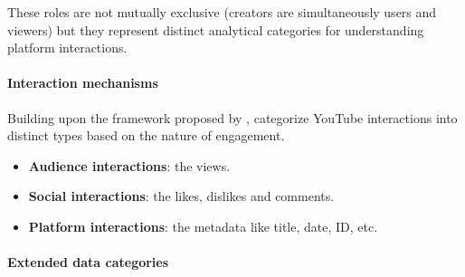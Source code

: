 These roles are not mutually exclusive (creators are simultaneously users and viewers) but they represent distinct analytical categories for understanding platform interactions.

\paragraph{Interaction mechanisms}

Building upon the framework proposed by \textcite{giglietto2012open}, \textcite{sui2022youtube} categorize YouTube interactions into distinct types based on the nature of engagement.

\begin{itemize}
    \item \textbf{Audience interactions}: the views.

    \item \textbf{Social interactions}: the likes, dislikes and comments.

    \item \textbf{Platform interactions}: the metadata like title, date, ID, etc.
\end{itemize}

\paragraph{Extended data categories}


